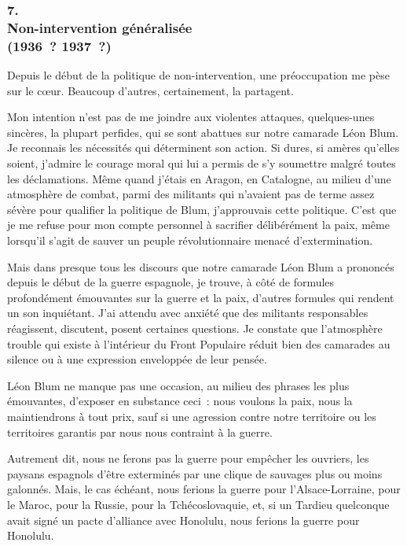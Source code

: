 \documentclass[french,twoside]{book} %
\begin{document}
\subsubsection[{7. Non-intervention généralisée, (1936 ? 1937 ?)}]{7. \\
Non-intervention généralisée \\
(1936 ? 1937 ?)}
\noindent \par
Depuis le début de la politique de non-intervention, une préoccupation me pèse sur le cœur. Beaucoup d'autres, certainement, la partagent.\par
Mon intention n'est pas de me joindre aux violentes attaques, quelques-unes sincères, la plupart perfides, qui se sont abattues sur notre camarade Léon Blum. Je reconnais les nécessités qui déterminent son action. Si dures, si amères qu'elles soient, j'admire le courage moral qui lui a permis de s'y soumettre malgré toutes les déclamations. Même quand j'étais en Aragon, en Catalogne, au milieu d'une atmosphère de combat, parmi des militants qui n'avaient pas de terme assez sévère pour qualifier la politique de Blum, j'approuvais cette politique. C'est que je me refuse pour mon compte person­nel à sacrifier délibérément la paix, même lorsqu'il s'agit de sauver un peuple révolutionnaire menacé d'extermination.\par
Mais dans presque tous les discours que notre camarade Léon Blum a prononcés depuis le début de la guerre espagnole, je trouve, à côté de formu­les profondément émouvantes sur la guerre et la paix, d'autres formules qui rendent un son inquiétant. J'ai attendu avec anxiété que des militants respon­sables réagissent, discutent, posent certaines questions. Je constate que l'atmosphère trouble qui existe à l'intérieur du Front Populaire réduit bien des camarades au silence ou à une expression enveloppée de leur pensée.\par
Léon Blum ne manque pas une occasion, au milieu des phrases les plus émouvantes, d'exposer en substance ceci : nous voulons la paix, nous la maintiendrons à tout prix, sauf si une agression contre notre territoire ou les territoires garantis par nous nous contraint à la guerre.\par
Autrement dit, nous ne ferons pas la guerre pour empêcher les ouvriers, les paysans espagnols d'être exterminés par une clique de sauvages plus ou moins galonnés. Mais, le cas échéant, nous ferions la guerre pour l'Alsace-Lorraine, pour le Maroc, pour la Russie, pour la Tchécoslovaquie, et, si un Tardieu quelconque avait signé un pacte d'alliance avec Honolulu, nous ferions la guerre pour Honolulu.\par
\end{document}
